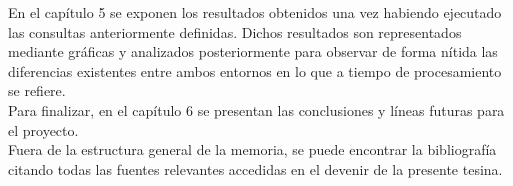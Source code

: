 En el capítulo 5 se exponen los resultados obtenidos una vez habiendo ejecutado las consultas anteriormente definidas. Dichos resultados son representados mediante gráficas y analizados posteriormente para observar de forma nítida las diferencias existentes entre ambos entornos en lo que a tiempo de procesamiento se refiere.\\

Para finalizar, en el capítulo 6 se presentan las conclusiones y líneas futuras para el proyecto.\\

Fuera de la estructura general de la memoria, se puede encontrar la bibliografía citando todas las fuentes relevantes accedidas en el devenir de la presente tesina.\\